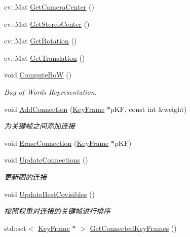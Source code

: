 \begin{DoxyCompactItemize}
cv\+::\+Mat \mbox{\hyperlink{class_o_r_b___s_l_a_m2_1_1_key_frame_a535f0f7db34aca7c55ddadc2ad9f4a5f}{Get\+Camera\+Center}} ()
\item 
cv\+::\+Mat \mbox{\hyperlink{class_o_r_b___s_l_a_m2_1_1_key_frame_aac7e26797d9b3e7ef4acd656056ff4ce}{Get\+Stereo\+Center}} ()
\item 
cv\+::\+Mat \mbox{\hyperlink{class_o_r_b___s_l_a_m2_1_1_key_frame_a43cdfc1cebc87d949ae6e9a0202b0f1b}{Get\+Rotation}} ()
\item 
cv\+::\+Mat \mbox{\hyperlink{class_o_r_b___s_l_a_m2_1_1_key_frame_a6f1426dc5447170df37c31db40edef14}{Get\+Translation}} ()
\item 
void \mbox{\hyperlink{class_o_r_b___s_l_a_m2_1_1_key_frame_ac376017c23823c05a6bb851ffb2fdd8f}{Compute\+BoW}} ()
\begin{DoxyCompactList}\small\item\em Bag of Words Representation. \end{DoxyCompactList}\item 
void \mbox{\hyperlink{class_o_r_b___s_l_a_m2_1_1_key_frame_a8d21a23485b7c104a73d6ad3cccf4e93}{Add\+Connection}} (\mbox{\hyperlink{class_o_r_b___s_l_a_m2_1_1_key_frame}{Key\+Frame}} $\ast$p\+KF, const int \&weight)
\begin{DoxyCompactList}\small\item\em 为关键帧之间添加连接 \end{DoxyCompactList}\item 
void \mbox{\hyperlink{class_o_r_b___s_l_a_m2_1_1_key_frame_a0a2e676f5e594cf9330e197a2c7df378}{Erase\+Connection}} (\mbox{\hyperlink{class_o_r_b___s_l_a_m2_1_1_key_frame}{Key\+Frame}} $\ast$p\+KF)
\item 
void \mbox{\hyperlink{class_o_r_b___s_l_a_m2_1_1_key_frame_afe7026956c91d4e0a01812be9dc7e8d5}{Update\+Connections}} ()
\begin{DoxyCompactList}\small\item\em 更新图的连接 \end{DoxyCompactList}\item 
void \mbox{\hyperlink{class_o_r_b___s_l_a_m2_1_1_key_frame_a09cb8502509c136536bf8d45793f8872}{Update\+Best\+Covisibles}} ()
\begin{DoxyCompactList}\small\item\em 按照权重对连接的关键帧进行排序 \end{DoxyCompactList}\item 
std\+::set$<$ \mbox{\hyperlink{class_o_r_b___s_l_a_m2_1_1_key_frame}{Key\+Frame}} $\ast$ $>$ \mbox{\hyperlink{class_o_r_b___s_l_a_m2_1_1_key_frame_af4ffdf4441477a36c42d6605c573f1cf}{Get\+Connected\+Key\+Frames}} ()

\end{DoxyCompactItemize}
